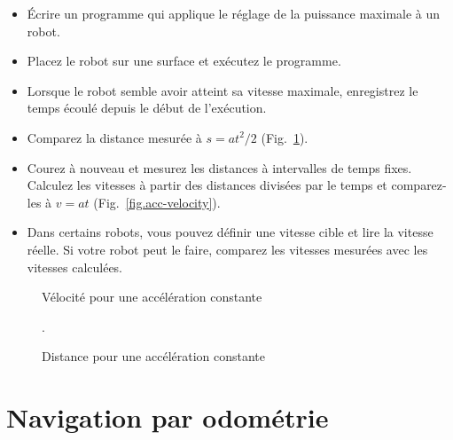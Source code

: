 {\begin{framed}
\begin{itemize}
\item Écrire un programme qui applique le réglage de la puissance maximale à un robot.
\item Placez le robot sur une surface et exécutez le programme.
\item Lorsque le robot semble avoir atteint sa vitesse maximale, enregistrez le temps écoulé depuis le début de l'exécution.
\item Comparez la distance mesurée à $s = at^2/2$ (Fig.~\ref{fig.acc-distance}).
\item Courez à nouveau et mesurez les distances à intervalles de temps fixes. Calculez les vitesses à partir des distances divisées par le temps et comparez-les à $v=at$ (Fig.~\ref{fig.acc-velocity}).
\item Dans certains robots, vous pouvez définir une vitesse cible et lire la vitesse réelle. Si votre robot peut le faire, comparez les vitesses mesurées avec les vitesses calculées.
\end{itemize}
\end{framed}

\begin{figure}
\begin{minipage}{.45\textwidth}
\caption{Vélocité pour une accélération constante}\label{fig.acc-velocity}
\end{minipage}
\hspace{\fill}
\begin{minipage}{.45\textwidth}
\caption{Distance pour une accélération constante}\label{fig.acc-distance}.
\end{minipage}
\end{figure}

\section{Navigation par odométrie}\label{s.odometry}

}
